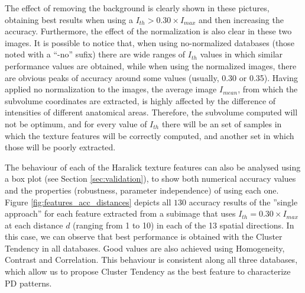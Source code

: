 The effect of removing the background is clearly shown in these pictures, obtaining best results when using a $I_{th}>0.30\times I_{max}$ and then increasing the accuracy. Furthermore, the effect of the normalization is also clear in these two images. It is possible to notice that, when using no-normalized databases (those noted with a ``-no'' sufix) there are wide ranges of $I_{th}$ values in which similar performance values are obtained, while when using the normalized images, there are obvious peaks of accuracy around some values (usually, 0.30 or 0.35). Having applied no normalization to the images, the average image $I_{mean}$, from which the subvolume coordinates are extracted, is highly affected by the difference of intensities of different anatomical areas. Therefore, the subvolume computed will not be optimum, and for every value of $I_{th}$ there will be an set of samples in which the texture features will be correctly computed, and another set in which those will be poorly extracted. 

The behaviour of each of the Haralick texture features can also be analysed using a box plot (see Section \ref{sec:validation}), to show both numerical accuracy values and the properties (robustness, parameter independence) of using each one. Figure \ref{fig:features_acc_distances} depicts all $130$ accuracy results of the ''single approach'' for each feature extracted from a subimage that uses $I_{th}=0.30\times I_{max}$ at each distance $d$ (ranging from 1 to 10) in each of the 13 spatial directions. In this case, we can observe that best performance is obtained with the Cluster Tendency in all databases. Good values are also achieved using Homogeneity, Contrast and Correlation. This behaviour is consistent along all three databases, which allow us to propose Cluster Tendency as the best feature to characterize PD patterns. 

